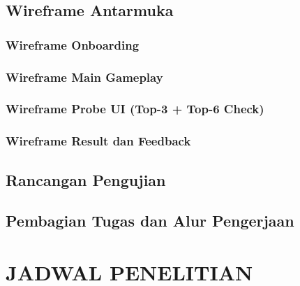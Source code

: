 \documentclass[12pt,a4paper,oneside,openany]{report}
\begin{document}
\subsection{Wireframe Antarmuka}
\label{subsec:wireframe}

\subsubsection{Wireframe Onboarding}

\subsubsection{Wireframe Main Gameplay}

\subsubsection{Wireframe Probe UI (Top-3 + Top-6 Check)}

\subsubsection{Wireframe Result dan Feedback}

\subsection{Rancangan Pengujian}
\label{subsec:rancangan-pengujian}

\subsection{Pembagian Tugas dan Alur Pengerjaan}
\label{subsec:pembagian-tugas}

\section{JADWAL PENELITIAN}
\label{sec:jadwal-penelitian}
%
\end{document}
